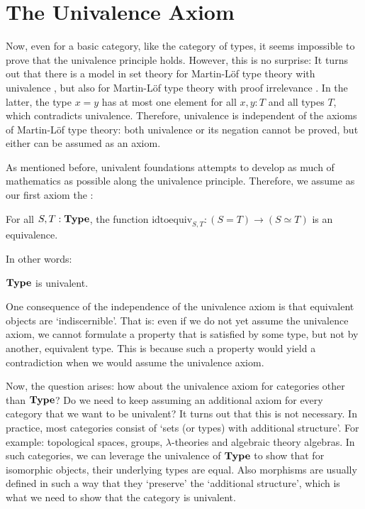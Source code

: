 \section{The Univalence Axiom}
Now, even for a basic category, like the category of types, it seems impossible to prove that the univalence principle holds. However, this is no surprise: It turns out that there is a model in set theory for Martin-Löf type theory with univalence \autocite{simplicial-set-model}, but also for Martin-Löf type theory with proof irrelevance \autocite{proof-irrelevant-model}. In the latter, the type $ x = y $ has at most one element for all $ x, y : T $ and all types $ T $, which contradicts univalence. Therefore, univalence is independent of the axioms of Martin-Löf type theory: both univalence or its negation cannot be proved, but either can be assumed as an axiom.

As mentioned before, univalent foundations attempts to develop as much of mathematics as possible along the univalence principle. Therefore, we assume as our first axiom the :
\begin{axiom}
  For all $ S, T: \mathbf{Type} $, the function $ \mathrm{idtoequiv}_{S, T}: (S = T) \to (S \simeq T) $ is an equivalence.
\end{axiom}
In other words:
\begin{axiom}
  $ \mathbf{Type} $ is univalent.
\end{axiom}

\begin{remark}
  One consequence of the independence of the univalence axiom is that equivalent objects are `indiscernible'. That is: even if we do not yet assume the univalence axiom, we cannot formulate a property that is satisfied by some type, but not by another, equivalent type. This is because such a property would yield a contradiction when we would assume the univalence axiom.
\end{remark}

Now, the question arises: how about the univalence axiom for categories other than $ \mathbf{Type} $? Do we need to keep assuming an additional axiom for every category that we want to be univalent? It turns out that this is not necessary. In practice, most categories consist of `sets (or types) with additional structure'. For example: topological spaces, groups, $ \lambda $-theories and algebraic theory algebras. In such categories, we can leverage the univalence of $ \mathbf{Type} $ to show that for isomorphic objects, their underlying types are equal. Also morphisms are usually defined in such a way that they `preserve' the `additional structure', which is what we need to show that the category is univalent.

